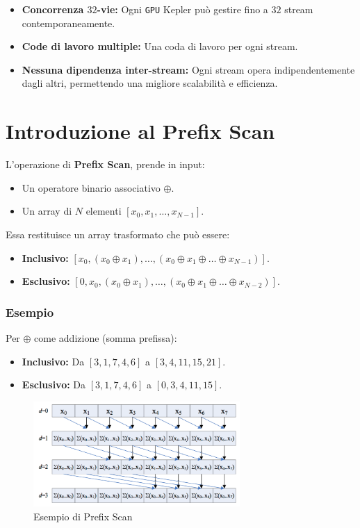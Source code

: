 \begin{itemize}
    \item \textbf{Concorrenza $32$-vie:} Ogni \texttt{GPU} Kepler può gestire
    fino a $32$ stream contemporaneamente.
    \item \textbf{Code di lavoro multiple:} Una coda di lavoro per ogni stream.
    \item \textbf{Nessuna dipendenza inter-stream:} Ogni stream opera
    indipendentemente dagli altri, permettendo una migliore scalabilità
    e efficienza.
\end{itemize}
\section{Introduzione al Prefix Scan}
L'operazione di \textbf{Prefix Scan}, prende in input:
\begin{itemize}
  \item Un operatore binario associativo $\oplus$.
  \item Un array di $N$ elementi $[x_0, x_1, \dots, x_{N-1}]$.
\end{itemize}
Essa restituisce un array trasformato che può essere:
\begin{itemize}
  \item \textbf{Inclusivo:} $[x_0, (x_0 \oplus x_1), \dots,
  (x_0 \oplus x_1 \oplus \dots \oplus x_{N-1})]$.
  \item \textbf{Esclusivo:} $[0, x_0, (x_0 \oplus x_1), \dots,
  (x_0 \oplus x_1 \oplus \dots \oplus x_{N-2})]$.
\end{itemize}

\subsubsection{Esempio}
Per $\oplus$ come addizione (somma prefissa):
\begin{itemize}
  \item \textbf{Inclusivo:} Da $[3, 1, 7, 4, 6]$ a $[3, 4, 11, 15, 21]$.
  \item \textbf{Esclusivo:} Da $[3, 1, 7, 4, 6]$ a $[0, 3, 4, 11, 15]$.
\end{itemize}
\begin{figure}[H]
  \centering
  \includegraphics[width=0.7\textwidth]{img/scan_1.png}
  \caption{Esempio di Prefix Scan}
\end{figure}
